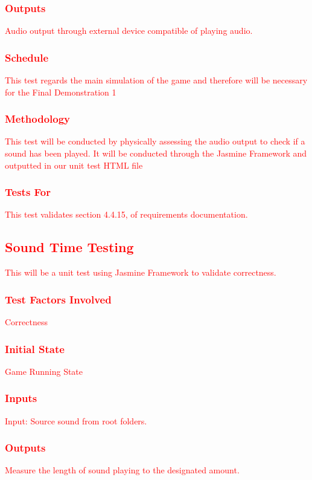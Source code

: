 \documentclass[11pt, oneside]{article}   	%
\begin{document}
\subsubsection{\textcolor{red}{Outputs}}
\textcolor{red}{Audio output through external device compatible of playing audio.}
\subsubsection{\textcolor{red}{Schedule}}
\textcolor{red}{This test regards the main simulation of the game and therefore will be necessary for the Final Demonstration 1}
\subsubsection{\textcolor{red}{Methodology}}
\textcolor{red}{This test will be conducted by physically assessing the audio output to check if a sound has been played. It will be conducted through the Jasmine Framework and outputted in our unit test HTML file}
\subsubsection{\textcolor{red}{Tests For}}
\textcolor{red}{This test validates section 4.4.15, of requirements documentation.}


\subsection{\textcolor{red}{Sound Time Testing}}
\textcolor{red}{This will be a unit test using Jasmine Framework to validate correctness.}
\subsubsection{\textcolor{red}{Test Factors Involved}}
\textcolor{red}{Correctness}
\subsubsection{\textcolor{red}{Initial State}}
\textcolor{red}{Game Running State}
\subsubsection{\textcolor{red}{Inputs}}
\textcolor{red}{Input: Source sound from root folders.}
\subsubsection{\textcolor{red}{Outputs}}
\textcolor{red}{Measure the length of sound playing to the designated amount.}
\end{document}
